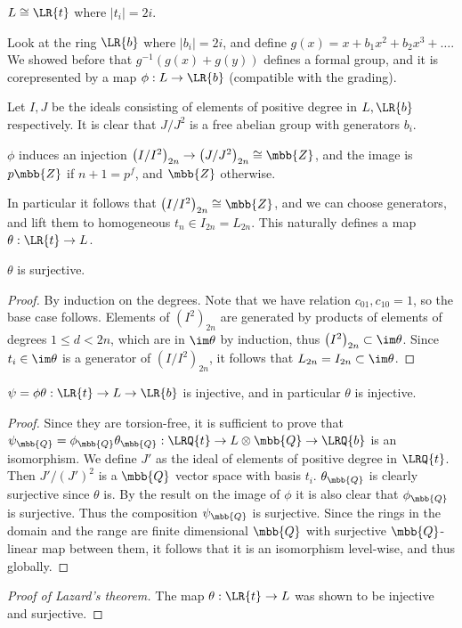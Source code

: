\begin{theorem*}[Lazard]
	$L \cong \LR{t}$ where $\left|t_i\right| = 2i$.
\end{theorem*}

Look at the ring $\LR{b}$ where $\left|b_i\right| = 2i$,
and define $g\left(x\right) = x + b_1 x^2 + b_2 x^3 + \dotsc$.
We showed before that $g^{-1}\left(g\left(x\right) + g\left(y\right)\right)$ defines a formal group,
and it is corepresented by a map $\phi: L \to \LR{b}$ (compatible with the grading).

Let $I,J$ be the ideals consisting of elements of positive degree in $L,\LR{b}$ respectively.
It is clear that $J/J^2$ is a free abelian group with generators $b_i$.

\begin{lemma*}
	$\phi$ induces an injection
	$\left(I/I^2\right)_{2n} \to \left(J/J^2\right)_{2n} \cong \mbb{Z}$,
	and the image is $p\mbb{Z}$ if $n+1=p^f$, and $\mbb{Z}$ otherwise.
\end{lemma*}

In particular it follows that $\left(I/I^2\right)_{2n} \cong \mbb{Z}$,
and we can choose generators, and lift them to homogeneous $t_n \in I_{2n} = L_{2n}$.
This naturally defines a map $\theta: \LR{t} \to L$.

\begin{lemma*}
	$\theta$ is surjective.
\end{lemma*}

\begin{proof}
	By induction on the degrees.
	Note that we have relation $c_{01}, c_{10} = 1$, so the base case follows.
	Elements of $\left(I^2\right)_{2n}$ are generated by products of elements of degrees $1 \leq d < 2n$, which are in $\im \theta$ by induction, thus $\left(I^2\right)_{2n} \subset \im \theta$.
	Since $t_i \in \im \theta$ is a generator of $\left(I/I^2\right)_{2n}$, it follows that $L_{2n} = I_{2n} \subset \im \theta$.
\end{proof}

\begin{lemma*}
	$\psi = \phi\theta: \LR{t} \to L \to \LR{b}$ is injective, and in particular $\theta$ is injective.
\end{lemma*}

\begin{proof}
	Since they are torsion-free, it is sufficient to prove that
	$\psi_\mbb{Q} = \phi_\mbb{Q}\theta_\mbb{Q}: \LRQ{t} \to L\otimes\mbb{Q} \to \LRQ{b}$
	is an isomorphism.
	We define $J'$ as the ideal of elements of positive degree in $\LRQ{t}$.
	Then $J'/\left(J'\right)^2$ is a $\mbb{Q}$ vector space with basis $t_i$.
	$\theta_\mbb{Q}$ is clearly surjective since $\theta$ is.
	By the result on the image of $\phi$ it is also clear that $\phi_\mbb{Q}$ is surjective.
	Thus the composition $\psi_\mbb{Q}$ is surjective.
	Since the rings in the domain and the range are finite dimensional $\mbb{Q}$ with surjective $\mbb{Q}$-linear map between them, it follows that it is an isomorphism level-wise, and thus globally.
\end{proof}

\begin{proof}[Proof of Lazard's theorem]
	The map $\theta: \LR{t} \to L$ was shown to be injective and surjective.
\end{proof}
